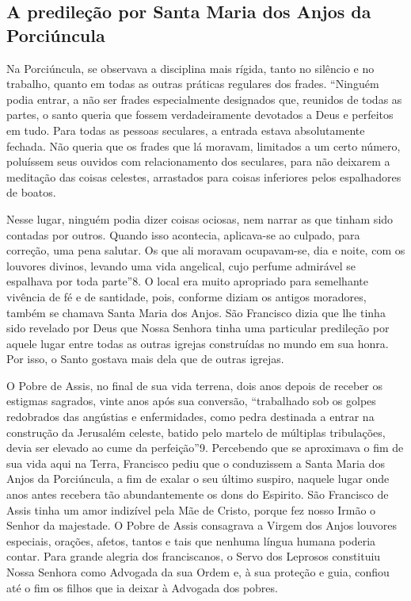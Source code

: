 \documentclass[a4paper,12pt]{extarticle} \usepackage[utf8]{inputenc}
\begin{document}
\subsection{A predileção por Santa Maria dos Anjos da Porciúncula}

Na Porciúncula, se observava a disciplina mais rígida, tanto no silêncio e no trabalho, quanto em todas as outras práticas regulares dos frades. “Ninguém podia entrar, a não ser frades especialmente designados que, reunidos de todas as partes, o santo queria que fossem verdadeiramente devotados a Deus e perfeitos em tudo. Para todas as pessoas seculares, a entrada estava absolutamente fechada. Não queria que os frades que lá moravam, limitados a um certo número, poluíssem seus ouvidos com relacionamento dos seculares, para não deixarem a meditação das coisas celestes, arrastados para coisas inferiores pelos espalhadores de boatos.

Nesse lugar, ninguém podia dizer coisas ociosas, nem narrar as que tinham sido contadas por outros. Quando isso acontecia, aplicava-se ao culpado, para correção, uma pena salutar. Os que ali moravam ocupavam-se, dia e noite, com os louvores divinos, levando uma vida angelical, cujo perfume admirável se espalhava por toda parte”8. O local era muito apropriado para semelhante vivência de fé e de santidade, pois, conforme diziam os antigos moradores, também se chamava Santa Maria dos Anjos. São Francisco dizia que lhe tinha sido revelado por Deus que Nossa Senhora tinha uma particular predileção por aquele lugar entre todas as outras igrejas construídas no mundo em sua honra. Por isso, o Santo gostava mais dela que de outras igrejas.

O Pobre de Assis, no final de sua vida terrena, dois anos depois de receber os estigmas sagrados, vinte anos após sua conversão, “trabalhado sob os golpes redobrados das angústias e enfermidades, como pedra destinada a entrar na construção da Jerusalém celeste, batido pelo martelo de múltiplas tribulações, devia ser elevado ao cume da perfeição”9. Percebendo que se aproximava o fim de sua vida aqui na Terra, Francisco pediu que o conduzissem a Santa Maria dos Anjos da Porciúncula, a fim de exalar o seu último suspiro, naquele lugar onde anos antes recebera tão abundantemente os dons do Espirito. São Francisco de Assis tinha um amor indizível pela Mãe de Cristo, porque fez nosso Irmão o Senhor da majestade. O Pobre de Assis consagrava a Virgem dos Anjos louvores especiais, orações, afetos, tantos e tais que nenhuma língua humana poderia contar. Para grande alegria dos franciscanos, o Servo dos Leprosos constituiu Nossa Senhora como Advogada da sua Ordem e, à sua proteção e guia, confiou até o fim os filhos que ia deixar à Advogada dos pobres.
\end{document}
